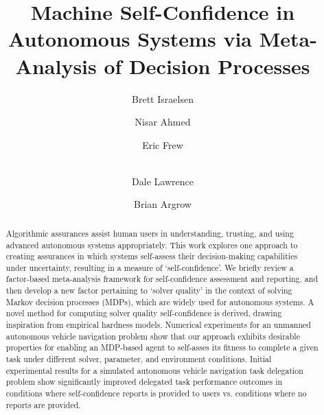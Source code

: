 \documentclass{llncs} %
\title{Machine Self-Confidence in Autonomous Systems via  Meta-Analysis of Decision Processes}%
\author{Brett Israelsen\inst{1} \and
Nisar Ahmed \inst{1} \and
Eric Frew \inst{1} \and \\
Dale Lawrence \inst{1} \and
Brian Argrow \inst{1}
}
\institute{University of Colorado Boulder, Boulder CO 80309, USA
\email{brett.israelsen@colorado.edu; nisar.ahmed@colorado.edu}\\
\url{http://www.cohrint.info}}
\newcommand{\hlr}[1]{{\color{red} #1}}
\newcommand{\nisar}[1]{\hlr{NRA: #1}}
\begin{document}
\maketitle
\begin{abstract}
    Algorithmic assurances assist human users in understanding, trusting, and using advanced autonomous systems appropriately. This work explores one approach to creating assurances in which systems self-assess their decision-making capabilities under uncertainty, resulting in a measure of `self-confidence'. 
    We briefly review a factor-based meta-analysis framework for self-confidence assessment and reporting, and then develop a new factor pertaining to `solver quality' in the context of solving Markov decision processes (MDPs), which are widely used for autonomous systems. A novel method for computing solver quality self-confidence is derived, drawing inspiration from empirical hardness models. Numerical experiments for an unmanned autonomous vehicle navigation problem show that our approach exhibits desirable properties for enabling an MDP-based agent to self-asses its fitness to complete a given task under different solver, parameter, and environment conditions. Initial experimental results for a simulated autonomous vehicle navigation task delegation problem %
    show significantly improved delegated task performance outcomes in conditions where self-confidence reports is provided to users vs. conditions where no reports are provided. %
\end{abstract}








\printbibliography
\end{document}
